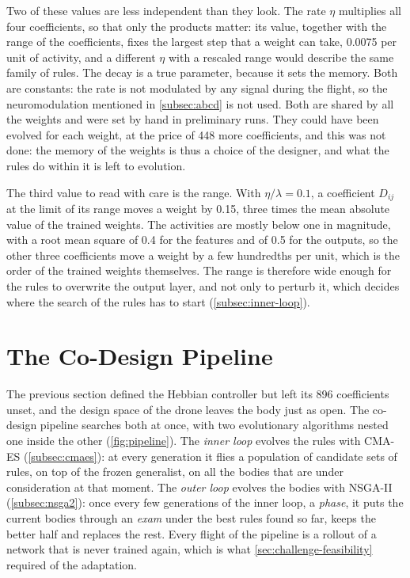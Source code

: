 Two of these values are less independent than they look. The rate $\eta$ multiplies all four coefficients, so that only the products matter: its value, together with the range of the coefficients, fixes the largest step that a weight can take, 0.0075 per unit of activity, and a different $\eta$ with a rescaled range would describe the same family of rules. The decay is a true parameter, because it sets the memory. Both are constants: the rate is not modulated by any signal during the flight, so the neuromodulation mentioned in \autoref{subsec:abcd} is not used. Both are shared by all the weights and were set by hand in preliminary runs. They could have been evolved for each weight, at the price of 448 more coefficients, and this was not done: the memory of the weights is thus a choice of the designer, and what the rules do within it is left to evolution.

The third value to read with care is the range. With $\eta/\lambda = 0.1$, a coefficient $D_{ij}$ at the limit of its range moves a weight by 0.15, three times the mean absolute value of the trained weights. The activities are mostly below one in magnitude, with a root mean square of 0.4 for the features and of 0.5 for the outputs, so the other three coefficients move a weight by a few hundredths per unit, which is the order of the trained weights themselves. The range is therefore wide enough for the rules to overwrite the output layer, and not only to perturb it, which decides where the search of the rules has to start (\autoref{subsec:inner-loop}).

\section{The Co-Design Pipeline}
\label{sec:pipeline}

The previous section defined the Hebbian controller but left its 896 coefficients unset, and the design space of the drone leaves the body just as open. The co-design pipeline searches both at once, with two evolutionary algorithms nested one inside the other (\autoref{fig:pipeline}). The \emph{inner loop} evolves the rules with CMA-ES (\autoref{subsec:cmaes}): at every generation it flies a population of candidate sets of rules, on top of the frozen generalist, on all the bodies that are under consideration at that moment. The \emph{outer loop} evolves the bodies with NSGA-II (\autoref{subsec:nsga2}): once every few generations of the inner loop, a \emph{phase}, it puts the current bodies through an \emph{exam} under the best rules found so far, keeps the better half and replaces the rest. Every flight of the pipeline is a rollout of a network that is never trained again, which is what \autoref{sec:challenge-feasibility} required of the adaptation.

